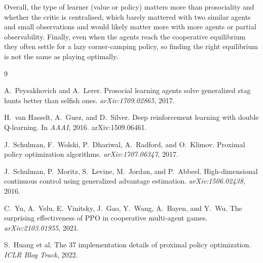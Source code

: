 \documentclass{article}
\begin{document}
Overall, the type of learner (value or policy) matters more than prosociality and whether the critic is
centralised, which barely mattered with two similar agents and small observations and would
likely matter more with more agents or partial observability. Finally, even when the agents reach the
cooperative equilibrium they often settle for a lazy corner-camping policy, so finding the right
equilibrium is not the same as playing optimally. 



\small
\setlength{\bibsep}{1pt plus 0.3ex}

\begin{thebibliography}{9}
\setlength{\itemsep}{0pt}
\setlength{\parskip}{0pt}

A.~Peysakhovich and A.~Lerer.
\newblock Prosocial learning agents solve generalized stag hunts better than selfish ones.
\newblock \emph{arXiv:1709.02865}, 2017.

H.~van Hasselt, A.~Guez, and D.~Silver.
\newblock Deep reinforcement learning with double Q-learning.
\newblock In \emph{AAAI}, 2016. arXiv:1509.06461.

J.~Schulman, F.~Wolski, P.~Dhariwal, A.~Radford, and O.~Klimov.
\newblock Proximal policy optimization algorithms.
\newblock \emph{arXiv:1707.06347}, 2017.

J.~Schulman, P.~Moritz, S.~Levine, M.~Jordan, and P.~Abbeel.
\newblock High-dimensional continuous control using generalized advantage estimation.
\newblock \emph{arXiv:1506.02438}, 2016.

C.~Yu, A.~Velu, E.~Vinitsky, J.~Gao, Y.~Wang, A.~Bayen, and Y.~Wu.
\newblock The surprising effectiveness of PPO in cooperative multi-agent games.
\newblock \emph{arXiv:2103.01955}, 2021.

S.~Huang et al.
\newblock The 37 implementation details of proximal policy optimization.
\newblock \emph{ICLR Blog Track}, 2022.

\end{thebibliography}
\end{document}
